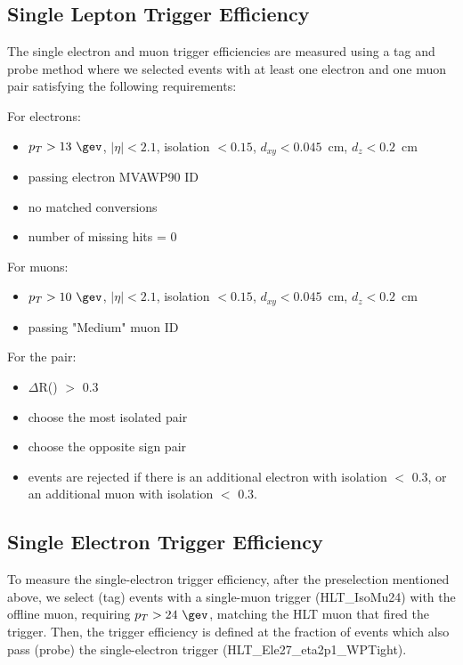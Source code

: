 \subsection{Single Lepton Trigger Efficiency}\label{sec:lepTrigger}


The single electron and muon trigger efficiencies are measured
using a tag and probe method where we selected events with at 
least one electron and one muon pair satisfying the following
requirements:

For electrons:
\begin{itemize}
  \item $p_T > 13~\gev$, $|\eta| < 2.1$, isolation $< 0.15$, $d_{xy}<0.045$~cm, $d_{z}<0.2$~cm
  \item passing electron MVAWP90 ID
  \item no matched conversions
  \item number of missing hits = 0
\end{itemize}

For muons:
\begin{itemize}
  \item $p_T > 10~\gev$, $|\eta| < 2.1$, isolation $< 0.15$, $d_{xy}<0.045$~cm, $d_{z}<0.2$~cm
  \item passing "Medium" muon ID
\end{itemize}

For the pair:
\begin{itemize}
  \item $\Delta$R(\tetm) $>$ 0.3
  \item choose the most isolated pair
  \item choose the opposite sign pair
  \item events are rejected if there is an additional electron with isolation $<$ 0.3, 
        or an additional muon with isolation $<$ 0.3.
\end{itemize}

\subsection{Single Electron Trigger Efficiency}\label{sec:eleTrigger}

To measure the single-electron trigger efficiency, after the
preselection mentioned above, we select (tag) events with a
single-muon trigger (HLT\_IsoMu24) with the offline muon, requiring $p_T > 24~\gev$,
 matching the HLT muon that fired the trigger.  Then, the trigger efficiency is
defined at the fraction of events which also pass (probe) the
single-electron trigger (HLT\_Ele27\_eta2p1\_WPTight).

